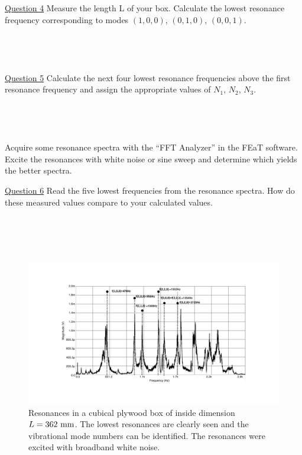 \documentclass[11pt]{NSF}
\begin{document}
\underline{Question 4} Measure the length L of your box. Calculate the lowest resonance frequency corresponding to modes $(1,0,0)$, $(0,1,0)$, $(0,0,1)$.
\\
\\
\\
\\
\\

\underline{Question 5}  Calculate the next four lowest resonance frequencies above the first resonance frequency and assign the appropriate values of $N_1$, $N_2$, $N_3$.
\\
\\
\\
\\
\\

Acquire some resonance spectra with the “FFT Analyzer” in the FEaT software. Excite the resonances
with white noise or sine sweep and determine which yields the better spectra.

\underline{Question 6} Read the five lowest frequencies from the resonance spectra. How do these measured values compare to your calculated values.
\\
\\
\\
\\
\\

%
\begin{figure}[hbtp]
\begin{center}
\includegraphics[width=.9\textwidth]{fig8_2}
\caption{Resonances in a cubical plywood box of inside dimension 
$L = 362~{\rm mm}$. 
The lowest resonances are clearly seen and the vibrational mode
numbers can be identified.
The resonances were excited with broadband white noise.}
\label{f:2}
\end{center}
\end{figure}
%
\end{document}
